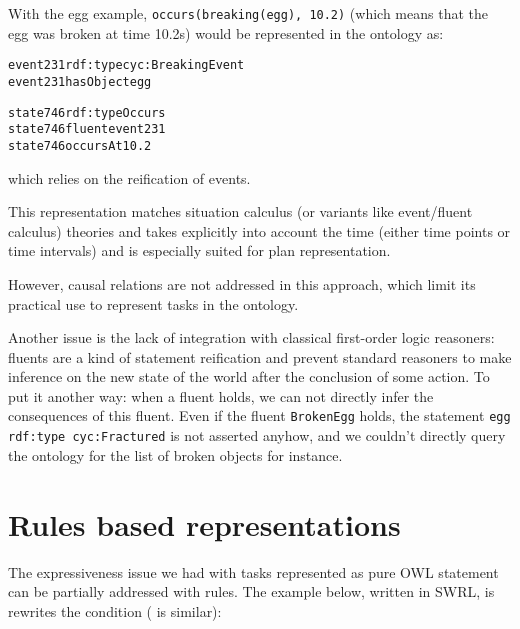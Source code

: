 With the egg example, {\tt occurs(breaking(egg), 10.2)} (which means that the egg was broken at time
10.2s) would be represented in the ontology as:

\begin{alltt}

event231 rdf:type cyc:BreakingEvent
event231 hasObject egg

state746 rdf:type Occurs
state746 fluent event231
state746 occursAt 10.2

\end{alltt}

which relies on the reification of events.


%
%
%

This representation matches situation calculus (or variants like event/fluent
calculus) theories and takes explicitly into account the time (either time
points or time intervals) and is especially suited for plan representation.

However, causal relations are not addressed in this approach, which limit its
practical use to represent tasks in the ontology.

Another issue is the lack of integration with classical first-order logic
reasoners: fluents are a kind of statement reification and prevent standard
reasoners to make inference on the new state of the world after the conclusion
of some action. To put it another way: when a fluent holds, we can not directly
infer the consequences of this fluent. Even if the fluent {\tt BrokenEgg}
holds, the statement {\tt egg rdf:type cyc:Fractured} is not asserted anyhow,
and we couldn't directly query the ontology for the list of broken objects for
instance.

\section{Rules based representations}

The expressiveness issue we had with tasks represented as pure OWL statement
can be partially addressed with rules. The example below, written in SWRL, is
rewrites the  condition
( is similar):

